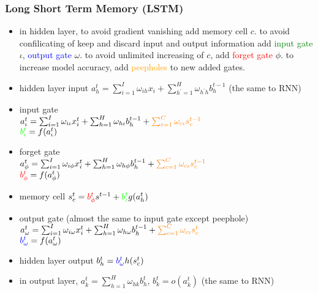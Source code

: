 \begin{frame}
\frametitle{Long Short Term Memory (LSTM)}
	\begin{itemize}
		\tiny
		\item in hidden layer, to avoid gradient vanishing add memory cell $c$. to avoid confilicating of keep and discard input and output information add \textcolor{green}{input gate} $\iota$, \textcolor{blue}{output gate} $\omega$. to avoid unlimited increasing of $c$, add \textcolor{red}{forget gate} $\phi$. to increase model accuracy, add \textcolor{orange}{peepholes} to new added gates.
		\scriptsize
		\item hidden layer input
		$a_h^t=\sum_{i=1}^{I}\omega_{ih}x_i+
									\sum_{h^{\prime}=1}^{H}
										\omega_{h^{\prime}h}b_{h}^{t-1}$ (the same to RNN)
		\item input gate
		\\$a_{\iota}^t=\sum_{i=1}^I\omega_{i\iota}x_i^t
						+\sum_{h=1}^{H}\omega_{h\iota}b_h^{t-1}
						+\textcolor{orange}{\sum_{c=1}^{C}\omega_{c\iota}s_c^{t-1}}$
		\\$\textcolor{green}{b_{\iota}^t}=f(a_{\iota}^t)$
		\item forget gate
		\\$a_{\phi}^t=\sum_{i=1}^I\omega_{i\phi}x_i^t
						+\sum_{h=1}^{H}\omega_{h\phi}b_h^{t-1}
						+\textcolor{orange}{\sum_{c=1}^{C}\omega_{c\iota}s_c^{t-1}}$
		\\$\textcolor{red}{b_{\phi}^t}=f(a_{\phi}^t)$
		\item memory cell
		$s_c^t=\textcolor{red}{b_{\phi}^t}s^{t-1}+\textcolor{green}{b_{\iota}^t}g(a_h^t)$
		\item output gate (almost the same to input gate except peephole)
		\\$a_{\omega}^t=\sum_{i=1}^I\omega_{i\omega}x_i^t
						+\sum_{h=1}^{H}\omega_{h\omega}b_h^{t-1}
						+\textcolor{orange}{\sum_{c=1}^{C}\omega_{c\iota}s_c^{t}}$
		\\$\textcolor{blue}{b_{\omega}^t}=f(a_{\omega}^t)$
		\item hidden layer output
		$b_h^t=\textcolor{blue}{b_{\omega}^t}h(s_c^t)$
		\item in output layer, $a_k^t=\sum_{h=1}^{H}\omega_{hk}b_h^t$,
		$b_k^t=o(a_k^t)$ (the same to RNN)
	\end{itemize}
\end{frame}
